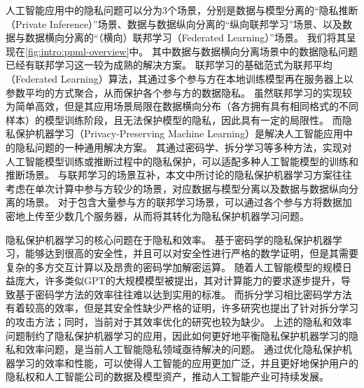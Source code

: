 人工智能应用中的隐私问题可以分为3个场景，分别是数据与模型分离的“隐私推断（Private Inference）”场景、数据与数据纵向分离的“纵向联邦学习”场景、以及数据与数据横向分离的“（横向）联邦学习（Federated Learning）”场景。
%
我们将其呈现在\autoref{fig:intro:ppml-overview}中。
%
其中数据与数据横向分离场景中的数据隐私问题已经有联邦学习这一较为成熟的解决方案。
联邦学习的基础范式为联邦平均（Federated Learning）算法，其通过多个参与方在本地训练模型再在服务器上以参数平均的方式聚合，从而保护各个参与方的数据隐私。
%
虽然联邦学习的实现较为简单高效，但是其应用场景局限在数据横向分布（各方拥有具有相同格式的不同样本）的模型训练阶段，且无法保护模型的隐私，因此具有一定的局限性。
%
而隐私保护机器学习（Privacy-Preserving Machine Learning）是解决人工智能应用中的隐私问题的一种通用解决方案。
%
其通过密码学、拆分学习等多种方法，实现对人工智能模型训练或推断过程中的隐私保护，可以适配多种人工智能模型的训练和推断场景。
%
与联邦学习的场景互补，本文中所讨论的隐私保护机器学习方案往往考虑在单次计算中参与方较少的场景，对应数据与模型分离以及数据与数据纵向分离的场景。
%
对于包含大量参与方的联邦学习场景，可以通过各个参与方将数据加密地上传至少数几个服务器，从而将其转化为隐私保护机器学习问题。

隐私保护机器学习的核心问题在于隐私和效率。
%
基于密码学的隐私保护机器学习，能够达到很高的安全性，并且可以对安全性进行严格的数学证明，但是其需要复杂的多方交互计算以及昂贵的密码学加解密运算。
随着人工智能模型的规模日益庞大，许多类似GPT的大规模模型被提出，其对计算能力的要求逐步提升，导致基于密码学方法的效率往往难以达到实用的标准。
%
而拆分学习相比密码学方法有着较高的效率，但是其安全性缺少严格的证明，许多研究也提出了针对拆分学习的攻击方法；同时，当前对于其效率优化的研究也较为缺少。
%
上述的隐私和效率问题制约了隐私保护机器学习的应用，因此如何更好地平衡隐私保护机器学习的隐私和效率问题，是当前人工智能隐私领域亟待解决的问题。
%
通过优化隐私保护机器学习的效率和性能，可以使得人工智能的应用更加广泛，并且更好地保护用户的隐私权和人工智能公司的数据及模型资产，推动人工智能产业可持续发展。


